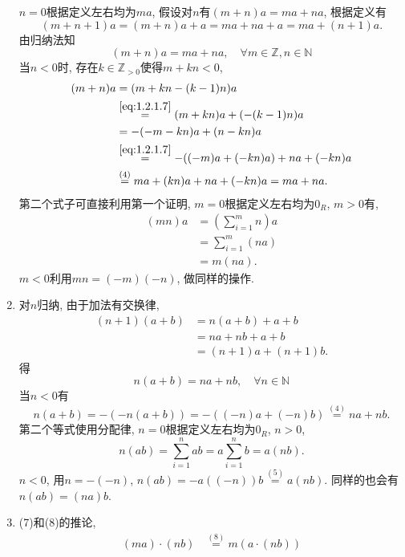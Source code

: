 \documentclass[UTF8,fontset=windows]{ctexart}
\newenvironment{solution}
{\begin{tcolorbox}[colback=blue!10, colframe=blue!50, title=\textit{proof}, breakable]}
{\end{tcolorbox}}
\begin{document}
\begin{solution}
\begin{enumerate}[(1)]
        $n = 0$根据定义左右均为$ma$, 假设对$n$有$(m + n)a = ma + na$, 根据定义有
        \[
            (m + n + 1)a = (m + n)a + a = ma + na + a = ma + (n + 1)a.
        \]
        由归纳法知
        \begin{equation}
            (m + n)a = ma + na, \quad \forall m \in \mathbb{Z}, n \in \mathbb{N}
            \tag{i}
            \label{eq:1.2.1.7}
        \end{equation}
    当$n < 0$时, 存在$k \in \mathbb{Z}_{>0}$使得$m + kn < 0$,
    \[
    \begin{aligned}
        (m + n)a &= (m + kn - (k - 1)n)a\\
        &\overset{\eqref{eq:1.2.1.7}}= (m + kn)a + (-(k - 1)n)a\\
        &= -(-m - kn)a + (n - kn)a\\
        &\overset{\eqref{eq:1.2.1.7}}= -((-m)a + (-kn)a) + na + (-kn)a\\
        &\overset{(4)}= ma + (kn)a + na + (-kn)a = ma + na.
    \end{aligned}   
    \]
        第二个式子可直接利用第一个证明, 
    $m = 0$根据定义左右均为$0_R$, $m > 0$有, 
    \[
    \begin{aligned}
        (mn)a &= \left(\sum_{i = 1}^{m} n\right)a\\
        &= \sum_{i = 1}^{m} (na)\\
        &= m(na).
    \end{aligned}
    \]
    $m < 0$利用$mn = (-m)(-n)$, 做同样的操作.
        \item 对$n$归纳, 由于加法有交换律,
    \[
    \begin{aligned}
        (n + 1)(a + b) &= n(a + b) + a + b\\
        &= na + nb + a + b\\
        &= (n + 1)a + (n + 1)b.
    \end{aligned}
    \]
    得
    \[
        n(a + b) = na + nb, \quad \forall n \in \mathbb{N}
    \]
    当$n < 0$有
    \[
        n(a + b) = -(-n(a + b)) = -((-n)a + (-n)b) \overset{(4)}= na + nb.
    \]
    第二个等式使用分配律, $n = 0$根据定义左右均为$0_R$, $n > 0$,
    \[
        n(ab) = \sum_{i = 1}^{n} ab = a\sum_{i = 1}^{n} b = a(nb).
    \]
    $n < 0$, 用$n = -(-n)$, $n(ab) = -a((-n))b \overset{(5)}= a(nb)$.
    同样的也会有$n(ab) = (na)b$.
        \item (7)和(8)的推论, 
    \[
    \begin{aligned}
        (ma) \cdot (nb) &\overset{(8)}= m(a \cdot (nb))\\

\end{aligned}\]
\end{enumerate}
\end{solution}
\end{document}
